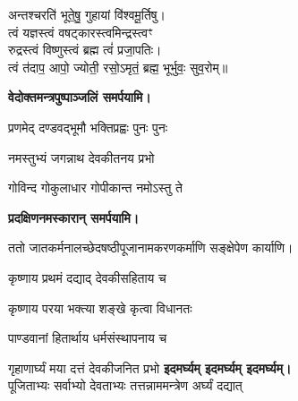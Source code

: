 \begin{center}
अन्तश्चरति॑ भूते॒षु॒ गुहायां वि॑श्वमू॒र्तिषु।\\
त्वं यज्ञस्त्वं वषट्कारस्त्वमिन्द्रस्त्वꣳ\\ रुद्रस्त्वं विष्णुस्त्वं ब्रह्म त्वं॑ प्रजा॒पतिः।\\
त्वं त॑दाप॒ आपो॒ ज्योती॒ रसो॒ऽमृतं॒ ब्रह्म॒ भूर्भुवः॒ सुव॒रोम्॥\medskip

\textbf{\devAya{} वेदोक्तमन्त्रपुष्पाञ्जलिं समर्पयामि।}
\medskip

{प्रणमेद् दण्डवद्भूमौ भक्तिप्रह्वः पुनः पुनः}
\medskip

{नमस्तुभ्यं जगन्नाथ देवकीतनय प्रभो}

{गोविन्द गोकुलाधार गोपीकान्त नमोऽस्तु ते}

\textbf{\devAya{} प्रदक्षिणनमस्कारान् समर्पयामि।}
\medskip




ततो जातकर्मनालच्छेदषष्ठीपूजानामकरणकर्माणि सङ्क्षेपेण कार्याणि।


{कृष्णाय प्रथमं दद्याद् देवकीसहिताय च}

{कृष्णाय परया भक्त्या शङ्खे कृत्वा विधानतः}
\medskip

{पाण्डवानां हितार्थाय धर्मसंस्थापनाय च}

{गृहाणार्घ्यं मया दत्तं देवकीजनित प्रभो}
\textbf{\devAya{} इदमर्घ्यम् इदमर्घ्यम् इदमर्घ्यम्।}
\medskip\\
पूजिताभ्यः सर्वाभ्यो देवताभ्यः तत्तन्नाममन्त्रेण अर्घ्यं दद्यात्\\


\end{center}
